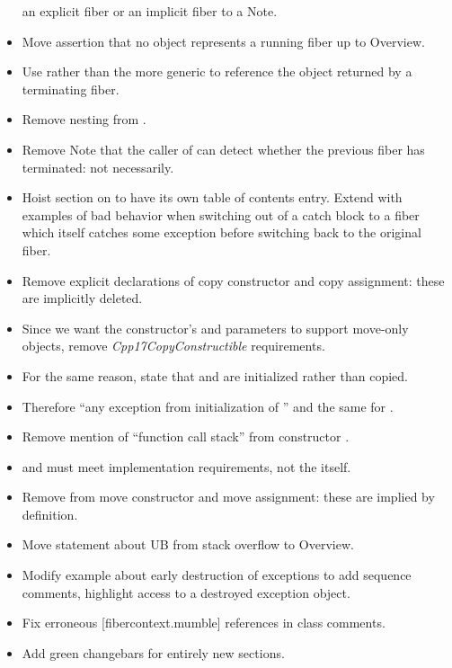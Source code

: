 \begin{itemize}
          an explicit fiber or an implicit fiber to a Note.
    \item Move assertion that no \fiber object represents a running fiber up
          to Overview.
    \item Use  rather than the more generic 
          to reference the \fiber object returned by a terminating fiber.
    \item Remove nesting from \resumewith \except.
    \item Remove Note that the caller of \resumewith can detect whether the
          previous fiber has terminated: not necessarily.
    \item Hoist section on \exfns to have its own table of contents entry.
          Extend with examples of bad behavior when switching out of a catch
          block to a fiber which itself catches some exception before
          switching back to the original fiber.
    \item Remove explicit  declarations of copy constructor and
          copy assignment: these are implicitly deleted.
    \item Since we want the constructor's  and 
          parameters to support move-only objects,
          remove \emph{Cpp17CopyConstructible} requirements.
    \item For the same reason, state that 
          and  are initialized rather than copied.
    \item Therefore ``any exception from initialization of ''
          and the same for .
    \item Remove mention of ``function call stack'' from constructor \except.
    \item {} and  must meet implementation
          requirements, not the  itself.
    \item Remove \postcond {} from move constructor and
          move assignment: these are implied by definition.
    \item Move statement about UB from stack overflow to \fiber Overview.
    \item Modify example about early destruction of exceptions to add sequence
          comments, highlight access to a destroyed exception object.
    \item Fix erroneous [fibercontext.mumble] references in class comments.
    \item Add green changebars for entirely new sections.

\end{itemize}
